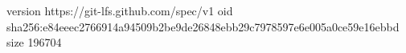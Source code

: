 version https://git-lfs.github.com/spec/v1
oid sha256:e84eeec2766914a94509b2be9de26848ebb29c7978597e6e005a0ce59e16ebbd
size 196704
